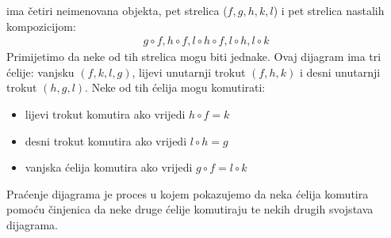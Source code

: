   \begin{center}
  \end{center}
  ima četiri neimenovana objekta, pet strelica ($f, g, h, k, l$) i pet
  strelica nastalih kompozicijom:
  \begin{align*}
    g \circ f, h \circ f, l \circ h \circ f, l \circ h, l \circ k
  \end{align*}
  Primijetimo da neke od tih strelica mogu biti jednake.
  Ovaj dijagram ima tri ćelije: vanjsku $(f, k, l, g)$, lijevi
  unutarnji trokut $(f, h, k)$ i desni unutarnji trokut $(h, g, l)$.
  Neke od tih ćelija mogu komutirati:
  \begin{itemize}
      \item lijevi trokut komutira ako vrijedi $h \circ f = k$
      \item desni trokut komutira ako vrijedi $l \circ h = g$
      \item vanjska ćelija komutira ako vrijedi $g \circ f = l \circ k$
  \end{itemize}
  Praćenje dijagrama je proces u kojem pokazujemo da neka ćelija komutira pomoću
  činjenica da neke druge ćelije komutiraju te nekih drugih svojstava dijagrama.

